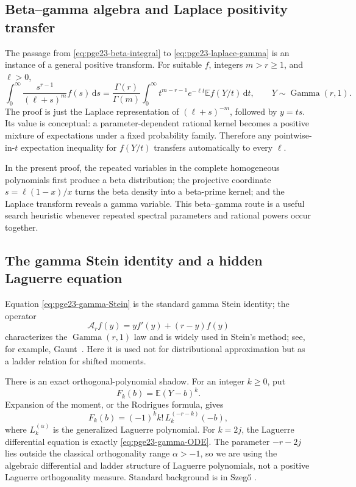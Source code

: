 ﻿\documentclass[11pt]{article}
\numberwithin{equation}{section}
\newcommand{\dd}{\,\mathrm d}
\newcommand{\E}{\mathbb E}
\newcommand{\GammaLaw}{\operatorname{Gamma}}
\begin{document}
\subsection{Beta--gamma algebra and Laplace positivity transfer}

The passage from \eqref{eq:pge23-beta-integral} to \eqref{eq:pge23-laplace-gamma} is an instance of a general positive transform.
For suitable $f$, integers $m>r\ge1$, and $\ell>0$,
\begin{equation}\label{eq:general-laplace-transfer}
  \int_0^\infty\frac{s^{r-1}}{(\ell+s)^m}f(s)\dd s
  =\frac{\Gamma(r)}{\Gamma(m)}
  \int_0^\infty t^{m-r-1}e^{-\ell t}
  \E f(Y/t)\dd t,
  \qquad Y\sim\GammaLaw(r,1).
\end{equation}
The proof is just the Laplace representation of $(\ell+s)^{-m}$, followed by $y=ts$.
Its value is conceptual: a parameter-dependent rational kernel becomes a positive mixture of expectations under a fixed probability family.
Therefore any pointwise-in-$t$ expectation inequality for $f(Y/t)$ transfers automatically to every $\ell$.

In the present proof, the repeated variables in the complete homogeneous polynomials first produce a beta distribution; the projective coordinate $s=\ell(1-x)/x$ turns the beta density into a beta-prime kernel; and the Laplace transform reveals a gamma variable.
This beta--gamma route is a useful search heuristic whenever repeated spectral parameters and rational powers occur together.

\subsection{The gamma Stein identity and a hidden Laguerre equation}

Equation \eqref{eq:pge23-gamma-Stein} is the standard gamma Stein identity; the operator
\[
  \mathcal A_rf(y)=yf'(y)+(r-y)f(y)
\]
characterizes the $\GammaLaw(r,1)$ law and is widely used in Stein's method; see, for example, Gaunt~\cite{Gaunt2016}.
Here it is used not for distributional approximation but as a ladder relation for shifted moments.

There is an exact orthogonal-polynomial shadow.
For an integer $k\ge0$, put
\[
  F_k(b)=\E(Y-b)^k.
\]
Expansion of the moment, or the Rodrigues formula, gives
\begin{equation}\label{eq:Laguerre-identity}
  F_k(b)=(-1)^k k!\,L_k^{(-r-k)}(-b),
\end{equation}
where $L_k^{(\alpha)}$ is the generalized Laguerre polynomial.
For $k=2j$, the Laguerre differential equation is exactly \eqref{eq:pge23-gamma-ODE}.
The parameter $-r-2j$ lies outside the classical orthogonality range $\alpha>-1$, so we are using the algebraic differential and ladder structure of Laguerre polynomials, not a positive Laguerre orthogonality measure.
Standard background is in Szeg\H{o} \cite{Szego1975}.
\end{document}
